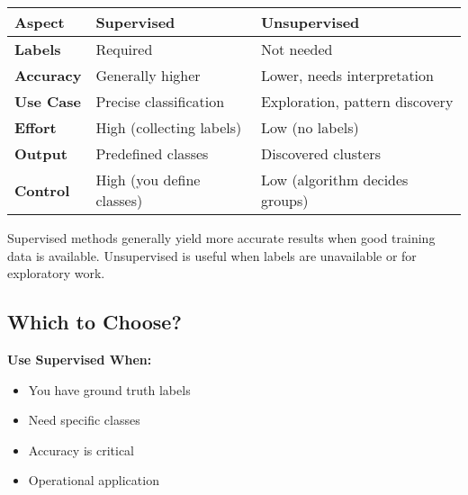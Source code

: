 \documentclass[
  letterpaper,
  DIV=11,
  numbers=noendperiod]{scrartcl}
\providecommand{\tightlist}{%
  \setlength{\itemsep}{0pt}\setlength{\parskip}{0pt}}
\begin{document}
\begin{longtable}[]{@{}
  >{\raggedright\arraybackslash}p{}
  >{\raggedright\arraybackslash}p{}
  >{\raggedright\arraybackslash}p{}@{}}
\toprule\noalign{}
\begin{minipage}[b]{\linewidth}\raggedright
\textbf{Aspect}
\end{minipage} & \begin{minipage}[b]{\linewidth}\raggedright
\textbf{Supervised}
\end{minipage} & \begin{minipage}[b]{\linewidth}\raggedright
\textbf{Unsupervised}
\end{minipage} \\
\midrule\noalign{}
\endhead
\bottomrule\noalign{}
\endlastfoot
\textbf{Labels} & Required & Not needed \\
\textbf{Accuracy} & Generally higher & Lower, needs interpretation \\
\textbf{Use Case} & Precise classification & Exploration, pattern
discovery \\
\textbf{Effort} & High (collecting labels) & Low (no labels) \\
\textbf{Output} & Predefined classes & Discovered clusters \\
\textbf{Control} & High (you define classes) & Low (algorithm decides
groups) \\
\end{longtable}

Supervised methods generally yield more accurate results when good
training data is available. Unsupervised is useful when labels are
unavailable or for exploratory work.

\subsection{Which to Choose?}\label{which-to-choose}

\textbf{Use Supervised When:}

\begin{itemize}
\tightlist
\item
  You have ground truth labels
\item
  Need specific classes
\item
  Accuracy is critical
\item
  Operational application
\end{itemize}
\end{document}
